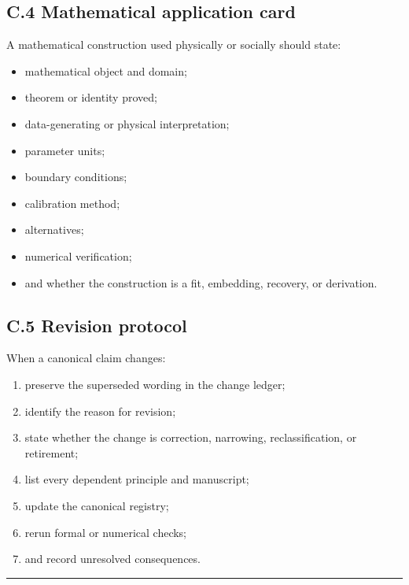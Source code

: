 \documentclass[
  11pt,
]{article}
\providecommand{\tightlist}{%
  \setlength{\itemsep}{0pt}\setlength{\parskip}{0pt}}
\begin{document}
\subsection{C.4 Mathematical application
card}\label{c.4-mathematical-application-card}

A mathematical construction used physically or socially should state:

\begin{itemize}
\tightlist
\item
  mathematical object and domain;
\item
  theorem or identity proved;
\item
  data-generating or physical interpretation;
\item
  parameter units;
\item
  boundary conditions;
\item
  calibration method;
\item
  alternatives;
\item
  numerical verification;
\item
  and whether the construction is a fit, embedding, recovery, or
  derivation.
\end{itemize}

\subsection{C.5 Revision protocol}\label{c.5-revision-protocol}

When a canonical claim changes:

\begin{enumerate}
\def\labelenumi{\arabic{enumi}.}
\tightlist
\item
  preserve the superseded wording in the change ledger;
\item
  identify the reason for revision;
\item
  state whether the change is correction, narrowing, reclassification,
  or retirement;
\item
  list every dependent principle and manuscript;
\item
  update the canonical registry;
\item
  rerun formal or numerical checks;
\item
  and record unresolved consequences.
\end{enumerate}

\begin{center}\rule{0.5\linewidth}{0.5pt}\end{center}
\end{document}
